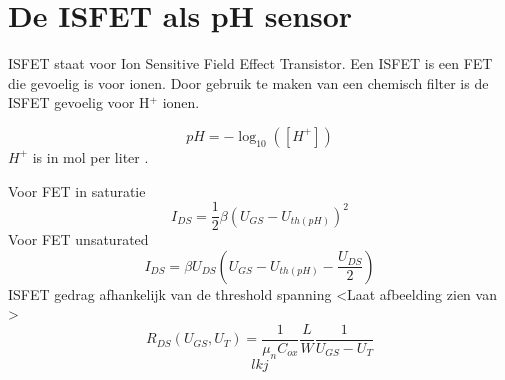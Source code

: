 \section{De ISFET als pH sensor}
ISFET staat voor Ion Sensitive Field Effect Transistor. Een ISFET is een FET die gevoelig is voor ionen. Door gebruik te maken van een chemisch filter is de ISFET gevoelig voor H$^+$ ionen. 

\begin{equation}
    pH=-\log_{10}\left(\left[H^+\right]\right)
\end{equation}
$H^+$ is in mol per liter \cite{buck2002measurement}.

Voor FET in saturatie
\begin{equation}
    I_{DS}=\frac{1}{2}\beta\left(U_{GS}-U_{th\left(pH\right)}\right)^2
\end{equation}
Voor FET unsaturated
\begin{equation}
    I_{DS}=\beta U_{DS}\left(U_{GS}-U_{th\left(pH\right)}-\frac{U_{DS}}{2}\right)
\end{equation}
ISFET gedrag afhankelijk van de threshold spanning \cite{martinoia2005modeling}
<Laat afbeelding zien van >
\begin{equation}
    R_{DS}\left(U_{GS},U_{T}\right)=\frac{1}{\mu_n C_{ox}}\frac{L}{W}\frac{1}{U_{GS}-U_T}
\end{equation}
\begin{equation}
    lkj
\end{equation}